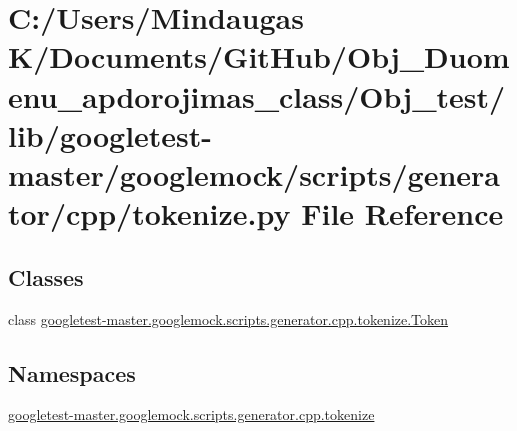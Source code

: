 \hypertarget{_obj__test_2lib_2googletest-master_2googlemock_2scripts_2generator_2cpp_2tokenize_8py}{}\section{C\+:/\+Users/\+Mindaugas K/\+Documents/\+Git\+Hub/\+Obj\+\_\+\+Duomenu\+\_\+apdorojimas\+\_\+class/\+Obj\+\_\+test/lib/googletest-\/master/googlemock/scripts/generator/cpp/tokenize.py File Reference}
\label{_obj__test_2lib_2googletest-master_2googlemock_2scripts_2generator_2cpp_2tokenize_8py}
\subsection*{Classes}
\begin{DoxyCompactItemize}
\item 
class \mbox{\hyperlink{classgoogletest-master_1_1googlemock_1_1scripts_1_1generator_1_1cpp_1_1tokenize_1_1_token}{googletest-\/master.\+googlemock.\+scripts.\+generator.\+cpp.\+tokenize.\+Token}}
\end{DoxyCompactItemize}
\subsection*{Namespaces}
\begin{DoxyCompactItemize}
\item 
 \mbox{\hyperlink{namespacegoogletest-master_1_1googlemock_1_1scripts_1_1generator_1_1cpp_1_1tokenize}{googletest-\/master.\+googlemock.\+scripts.\+generator.\+cpp.\+tokenize}}
\end{DoxyCompactItemize}
